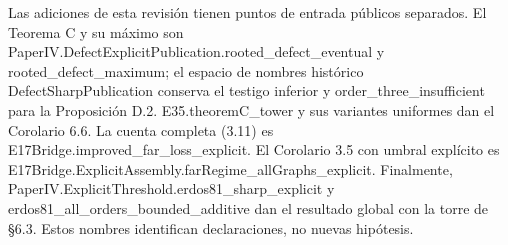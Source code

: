 \documentclass[spanish,11pt,a4paper]{article}
\begin{document}
Las adiciones de esta revisión tienen puntos de entrada públicos separados. El Teorema C y su máximo son {\ttfamily\small PaperIV.\discretionary{\hbox{\ensuremath{\hookrightarrow}}}{}{}DefectExplic\discretionary{\hbox{\ensuremath{\hookrightarrow}}}{}{}itPublicatio\discretionary{\hbox{\ensuremath{\hookrightarrow}}}{}{}n.\discretionary{\hbox{\ensuremath{\hookrightarrow}}}{}{}rooted\_\discretionary{\hbox{\ensuremath{\hookrightarrow}}}{}{}defect\_\discretionary{\hbox{\ensuremath{\hookrightarrow}}}{}{}eventual} y {\ttfamily\small rooted\_\discretionary{\hbox{\ensuremath{\hookrightarrow}}}{}{}defect\_\discretionary{\hbox{\ensuremath{\hookrightarrow}}}{}{}maximum}; el espacio de nombres histórico {\ttfamily\small DefectSharpP\discretionary{\hbox{\ensuremath{\hookrightarrow}}}{}{}ublication} conserva el testigo inferior y {\ttfamily\small order\_\discretionary{\hbox{\ensuremath{\hookrightarrow}}}{}{}three\_\discretionary{\hbox{\ensuremath{\hookrightarrow}}}{}{}insufficient} para la Proposición D.2. {\ttfamily\small E35.\discretionary{\hbox{\ensuremath{\hookrightarrow}}}{}{}theoremC\_\discretionary{\hbox{\ensuremath{\hookrightarrow}}}{}{}tower} y sus variantes uniformes dan el Corolario 6.6. La cuenta completa (3.11) es {\ttfamily\small E17Bridge.\discretionary{\hbox{\ensuremath{\hookrightarrow}}}{}{}improved\_\discretionary{\hbox{\ensuremath{\hookrightarrow}}}{}{}far\_\discretionary{\hbox{\ensuremath{\hookrightarrow}}}{}{}loss\_\discretionary{\hbox{\ensuremath{\hookrightarrow}}}{}{}explicit}. El Corolario 3.5 con umbral explícito es {\ttfamily\small E17Bridge.\discretionary{\hbox{\ensuremath{\hookrightarrow}}}{}{}ExplicitAsse\discretionary{\hbox{\ensuremath{\hookrightarrow}}}{}{}mbly.\discretionary{\hbox{\ensuremath{\hookrightarrow}}}{}{}farRegime\_\discretionary{\hbox{\ensuremath{\hookrightarrow}}}{}{}allGraphs\_\discretionary{\hbox{\ensuremath{\hookrightarrow}}}{}{}explicit}. Finalmente, {\ttfamily\small PaperIV.\discretionary{\hbox{\ensuremath{\hookrightarrow}}}{}{}ExplicitThre\discretionary{\hbox{\ensuremath{\hookrightarrow}}}{}{}shold.\discretionary{\hbox{\ensuremath{\hookrightarrow}}}{}{}erdos81\_\discretionary{\hbox{\ensuremath{\hookrightarrow}}}{}{}sharp\_\discretionary{\hbox{\ensuremath{\hookrightarrow}}}{}{}explicit} y {\ttfamily\small erdos81\_\discretionary{\hbox{\ensuremath{\hookrightarrow}}}{}{}all\_\discretionary{\hbox{\ensuremath{\hookrightarrow}}}{}{}orders\_\discretionary{\hbox{\ensuremath{\hookrightarrow}}}{}{}bounded\_\discretionary{\hbox{\ensuremath{\hookrightarrow}}}{}{}additive} dan el resultado global con la torre de §6.3. Estos nombres identifican declaraciones, no nuevas hipótesis.
\end{document}
